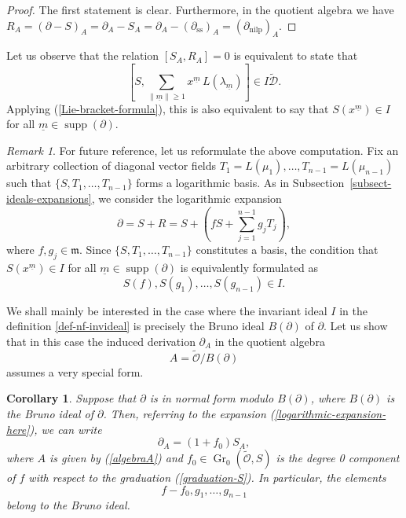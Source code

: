 \documentclass[10pt,twoside,reqno]{amsart}
\newtheorem{corollary}[thm]{Corollary}
\theoremstyle{remark}
\theoremstyle{remark}
\newtheorem{remark}[thm]{Remark}
\newcommand{\um}{{\underline m}}
\newcommand{\supp}{\operatorname{supp}}
\newcommand{\tmop}[1]{{\operatorname{#1}}}
\newcommand{\Gr}{\operatorname{Gr}}
\newcommand{\tO}{\widetilde{\mathcal{O}}}
\newcommand{\cD}{\mathcal{D}}
\newcommand{\tcD}{\widetilde{\cD}}
\begin{document}
\begin{proof}
  The first statement is clear. Furthermore, in the quotient algebra we have
  $R_A = (\partial - S)_A = \partial_A - S_A = \partial_A -
  (\partial_{\tmop{ss}})_A = (\partial_{\tmop{nilp}})_A$.
\end{proof}
Let us observe that the relation $[S_A, R_A] = 0$ is equivalent to state that
\
\[ \left[ S, \sum_{\|\um\| \ge 1} x^{\um} \, L(\lambda_{\um}) \right] \in I \tcD. \]
Applying (\ref{Lie-bracket-formula}), this is also equivalent to say that $S (x^\um) \in I$ for all $\um \in \supp(\partial)$.
\begin{remark}\label{remark-S(f)}
For future reference, let us reformulate the above computation. Fix an arbitrary collection of diagonal vector fields $T_1=L(\mu_1),\ldots,T_{n-1}=L(\mu_{n-1})$ such that $\{S, T_1, \dots, T_{n-1}\}$ forms a logarithmic basis. As in Subsection~\ref{subsect-ideals-expansions}, we consider the logarithmic expansion
\begin{equation}\label{logarithmic-expansion-here}
\partial = S + R = S + \left( f S + \sum_{j=1}^{n-1} g_j T_j\right),
\end{equation}
where $f,g_j \in \mathfrak{m}$. Since $\{S, T_1, \dots, T_{n-1}\}$ constitutes a basis, the condition that $S(x^\um) \in I$ for all $\um \in \supp(\partial)$ is equivalently formulated as
$$
S(f), S(g_1), \dots, S(g_{n-1}) \in I.
$$
\end{remark}
We shall mainly be interested in the case where the invariant ideal $I$ in the definition \ref{def-nf-invideal} is precisely the Bruno ideal $B(\partial)$ of $\partial$. Let us show that in this case the induced derivation $\partial_A$ in the quotient algebra 
\begin{equation}\label{algebraA}
A=\tO/B(\partial)
\end{equation}
assumes a very special form.
\begin{corollary}\label{cor:coeffsinB}
  \label{Corollary-coeffinB}Suppose that $\partial$ is in normal form modulo
  $B (\partial)$, where $B (\partial)$ is the Bruno ideal of $\partial$. Then, referring to the expansion (\ref{logarithmic-expansion-here}), 
  we can write
  \[ \partial_A = (1 + f_0) S_A, \]
  where $A$ is given by (\ref{algebraA}) and $f_0 \in \Gr_0(\tO, S)$ is the degree 0 component of $f$ with respect to the graduation (\ref{graduation-S}). In particular, the elements
  \[ f - f_0, g_1, \ldots, g_{n - 1} \]
  belong to the Bruno ideal. 
\end{corollary}
\end{document}
